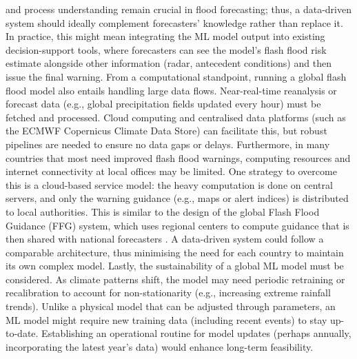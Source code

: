 and process understanding remain crucial in flood forecasting; thus, a data-driven system should ideally complement forecasters’ knowledge rather than replace it. In practice, this might mean integrating the ML model output into existing decision-support tools, where forecasters can see the model’s flash flood risk estimate alongside other information (radar, antecedent conditions) and then issue the final warning. From a computational standpoint, running a global flash flood model also entails handling large data flows. Near-real-time reanalysis or forecast data (e.g., global precipitation fields updated every hour) must be fetched and processed. Cloud computing and centralised data platforms (such as the ECMWF Copernicus Climate Data Store) can facilitate this, but robust pipelines are needed to ensure no data gaps or delays. Furthermore, in many countries that most need improved flash flood warnings, computing resources and internet connectivity at local offices may be limited. One strategy to overcome this is a cloud-based service model: the heavy computation is done on central servers, and only the warning guidance (e.g., maps or alert indices) is distributed to local authorities. This is similar to the design of the global Flash Flood Guidance (FFG) system, which uses regional centers to compute guidance that is then shared with national forecasters \citep{Georgakakos2022}. A data-driven system could follow a comparable architecture, thus minimising the need for each country to maintain its own complex model. Lastly, the sustainability of a global ML model must be considered. As climate patterns shift, the model may need periodic retraining or recalibration to account for non-stationarity (e.g., increasing extreme rainfall trends). Unlike a physical model that can be adjusted through parameters, an ML model might require new training data (including recent events) to stay up-to-date. Establishing an operational routine for model updates (perhaps annually, incorporating the latest year’s data) would enhance long-term feasibility.

